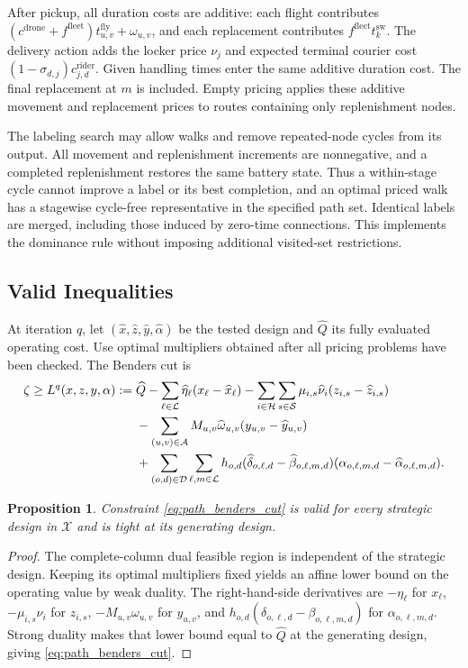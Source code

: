\documentclass[final,3p,authoryear]{elsarticle}
\newtheorem{proposition}{Proposition}
\begin{document}
After pickup, all duration costs are additive: each flight contributes $(c^{\mathrm{drone}}+f^{\mathrm{fleet}})t_{u,v}^{\mathrm{fly}}+\omega_{u,v}$, and each replacement contributes $f^{\mathrm{fleet}}t_k^{\mathrm{sw}}$.
The delivery action adds the locker price $\nu_j$ and expected terminal courier cost $(1-\sigma_{d,j})c_{j,d}^{\mathrm{rider}}$.
Given handling times enter the same additive duration cost.
The final replacement at $m$ is included.
Empty pricing applies these additive movement and replacement prices to routes containing only replenishment nodes.

The labeling search may allow walks and remove repeated-node cycles from its output.
All movement and replenishment increments are nonnegative, and a completed replenishment restores the same battery state.
Thus a within-stage cycle cannot improve a label or its best completion, and an optimal priced walk has a stagewise cycle-free representative in the specified path set.
Identical labels are merged, including those induced by zero-time connections.
This implements the dominance rule without imposing additional visited-set restrictions.

\subsection{Valid Inequalities}
\label{subsec:path_inequalities}

At iteration $q$, let $(\widehat x,\widehat z,\widehat y,\widehat\alpha)$ be the tested design and $\widehat Q$ its fully evaluated operating cost.
Use optimal multipliers obtained after all pricing problems have been checked.
The Benders cut is
\begin{align}
 \zeta\ge L^q(x,z,y,\alpha)
 :={}&\widehat Q
 -\sum_{\ell\in\mathcal L}\widehat\eta_\ell(x_\ell-\widehat x_\ell)
 -\sum_{i\in\mathcal H}\sum_{s\in\mathcal S}
 \mu_{i,s}\widehat\nu_i(z_{i,s}-\widehat z_{i,s})\notag\\
 &-\sum_{(u,v)\in\mathcal A}M_{u,v}\widehat\omega_{u,v}(y_{u,v}-\widehat y_{u,v})\notag\\
 &+\sum_{(o,d)\in\mathcal D}\sum_{\ell,m\in\mathcal L}
 h_{o,d}(\widehat\delta_{o,\ell,d}-\widehat\beta_{o,\ell,m,d})
 (\alpha_{o,\ell,m,d}-\widehat\alpha_{o,\ell,m,d}).
 \label{eq:path_benders_cut}
\end{align}

\begin{proposition}
Constraint \eqref{eq:path_benders_cut} is valid for every strategic design in $\mathcal X$ and is tight at its generating design.
\end{proposition}
\begin{proof}
The complete-column dual feasible region is independent of the strategic design.
Keeping its optimal multipliers fixed yields an affine lower bound on the operating value by weak duality.
The right-hand-side derivatives are $-\eta_\ell$ for $x_\ell$, $-\mu_{i,s}\nu_i$ for $z_{i,s}$, $-M_{u,v}\omega_{u,v}$ for $y_{u,v}$, and $h_{o,d}(\delta_{o,\ell,d}-\beta_{o,\ell,m,d})$ for $\alpha_{o,\ell,m,d}$.
Strong duality makes that lower bound equal to $\widehat Q$ at the generating design, giving \eqref{eq:path_benders_cut}.
\end{proof}
\end{document}
